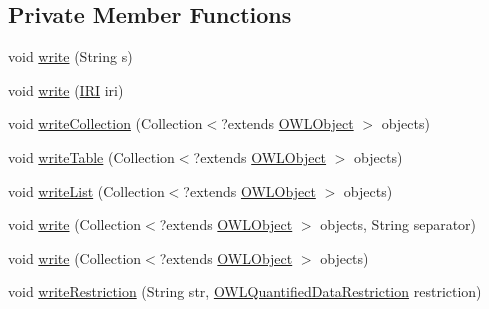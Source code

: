 \subsection*{Private Member Functions}
\begin{DoxyCompactItemize}
\item 
void \hyperlink{classuk_1_1ac_1_1manchester_1_1owl_1_1owlapi_1_1tutorialowled2011_1_1_o_w_l_tutorial_syntax_object_renderer_a05a4ff29615641d4485112de6566cc65}{write} (String s)
\item 
void \hyperlink{classuk_1_1ac_1_1manchester_1_1owl_1_1owlapi_1_1tutorialowled2011_1_1_o_w_l_tutorial_syntax_object_renderer_a6eb49cc3266aa1c00e4bed93bf8e1a90}{write} (\hyperlink{classorg_1_1semanticweb_1_1owlapi_1_1model_1_1_i_r_i}{I\-R\-I} iri)
\item 
void \hyperlink{classuk_1_1ac_1_1manchester_1_1owl_1_1owlapi_1_1tutorialowled2011_1_1_o_w_l_tutorial_syntax_object_renderer_a3bd3fd42d203f9026f93dd542121cf38}{write\-Collection} (Collection$<$?extends \hyperlink{interfaceorg_1_1semanticweb_1_1owlapi_1_1model_1_1_o_w_l_object}{O\-W\-L\-Object} $>$ objects)
\item 
void \hyperlink{classuk_1_1ac_1_1manchester_1_1owl_1_1owlapi_1_1tutorialowled2011_1_1_o_w_l_tutorial_syntax_object_renderer_ae3cbe44f752c6c44f25cc6096fa8acd6}{write\-Table} (Collection$<$?extends \hyperlink{interfaceorg_1_1semanticweb_1_1owlapi_1_1model_1_1_o_w_l_object}{O\-W\-L\-Object} $>$ objects)
\item 
void \hyperlink{classuk_1_1ac_1_1manchester_1_1owl_1_1owlapi_1_1tutorialowled2011_1_1_o_w_l_tutorial_syntax_object_renderer_a7ffde0d448e76d49a0f395ba7f514888}{write\-List} (Collection$<$?extends \hyperlink{interfaceorg_1_1semanticweb_1_1owlapi_1_1model_1_1_o_w_l_object}{O\-W\-L\-Object} $>$ objects)
\item 
void \hyperlink{classuk_1_1ac_1_1manchester_1_1owl_1_1owlapi_1_1tutorialowled2011_1_1_o_w_l_tutorial_syntax_object_renderer_abbf7f75c4ebf7a43e63d90078a5accf3}{write} (Collection$<$?extends \hyperlink{interfaceorg_1_1semanticweb_1_1owlapi_1_1model_1_1_o_w_l_object}{O\-W\-L\-Object} $>$ objects, String separator)
\item 
void \hyperlink{classuk_1_1ac_1_1manchester_1_1owl_1_1owlapi_1_1tutorialowled2011_1_1_o_w_l_tutorial_syntax_object_renderer_a1a21aa2bc2f52a0778d879b3199f7ff0}{write} (Collection$<$?extends \hyperlink{interfaceorg_1_1semanticweb_1_1owlapi_1_1model_1_1_o_w_l_object}{O\-W\-L\-Object} $>$ objects)
\item 
void \hyperlink{classuk_1_1ac_1_1manchester_1_1owl_1_1owlapi_1_1tutorialowled2011_1_1_o_w_l_tutorial_syntax_object_renderer_a3268504c508f1b53d6d59af4b36a66cc}{write\-Restriction} (String str, \hyperlink{interfaceorg_1_1semanticweb_1_1owlapi_1_1model_1_1_o_w_l_quantified_data_restriction}{O\-W\-L\-Quantified\-Data\-Restriction} restriction)

\end{DoxyCompactItemize}
